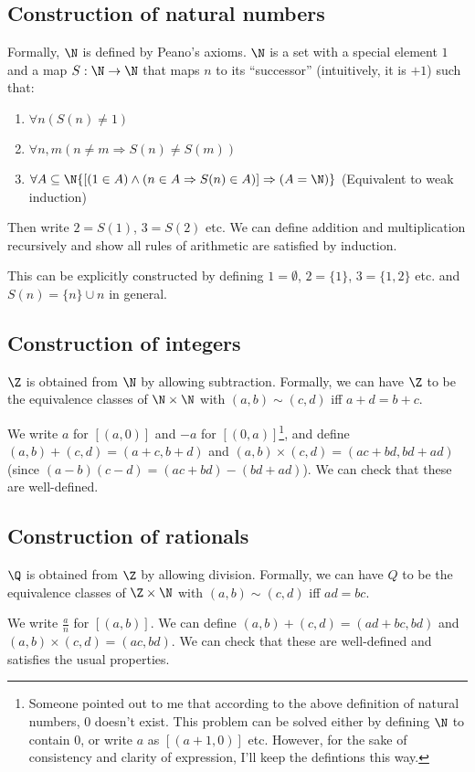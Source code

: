 \documentclass[a4paper]{article}
\begin{document}
  \subsection{Construction of natural numbers}
  \begin{defi}
    Formally, $\N$ is defined by Peano's axioms. $\N$ is a set with a special element $1$ and a map $S: \N \to \N$ that maps $n$ to its ``successor'' (intuitively, it is $+1$) such that:
    \begin{enumerate}
      \item $\forall n(S(n) \not= 1)$
      \item $\forall n, m(n \not= m\Rightarrow S(n)\not= S(m))$
      \item $\forall A\subseteq \N\{[(1\in A)\wedge (n\in A\Rightarrow S(n)\in A)]\Rightarrow (A = \N)\}$ (Equivalent to weak induction)
    \end{enumerate}
    Then write $2 = S(1)$, $3 = S(2)$ etc. We can define addition and multiplication recursively and show all rules of arithmetic are satisfied by induction.

    This can be explicitly constructed by defining $1 = \emptyset$, $2 = \{1\}$, $3 = \{1, 2\}$ etc. and $S(n) = \{n\}\cup n$ in general.
  \end{defi}

  \subsection{Construction of integers}
  \begin{defi}[Integers]
    $\Z$ is obtained from $\N$ by allowing subtraction. Formally, we can have $\Z$ to be the equivalence classes of $\N\times \N$ with $(a, b) \sim (c, d)$ iff $a + d = b + c$.

    We write $a$ for $[(a, 0)]$ and $-a$ for $[(0, a)]$\footnote{Someone pointed out to me that according to the above definition of natural numbers, $0$ doesn't exist. This problem can be solved either by defining $\N$ to contain 0, or write $a$ as $[(a + 1, 0)]$ etc. However, for the sake of consistency and clarity of expression, I'll keep the defintions this way.}, and define $(a, b) + (c, d) = (a + c, b + d)$ and $(a, b)\times (c, d) = (ac + bd, bd + ad)$ (since $(a - b)(c - d) = (ac + bd) - (bd + ad)$). We can check that these are well-defined.
  \end{defi}

  \subsection{Construction of rationals}
  \begin{defi}[Rationals]
    $\Q$ is obtained from $\Z$ by allowing division. Formally, we can have $Q$ to be the equivalence classes of $\Z \times \N$ with $(a, b) \sim (c, d)$ iff $ad = bc$.

    We write $\frac{a}{n}$ for $[(a, b)]$. We can define $(a, b) + (c, d) = (ad + bc, bd)$ and $(a, b)\times (c, d) = (ac, bd)$. We can check that these are well-defined and satisfies the usual properties. 
  \end{defi}
\end{document}
